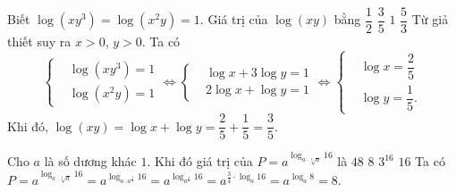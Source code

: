 	\begin{ex}
		Biết $\log\left(xy^3\right)=\log\left(x^2y\right)=1$. Giá trị của $\log(xy)$ bằng
		\choice
		{$\dfrac{1}{2}$}
		{\True $\dfrac{3}{5}$}
		{$1$}
		{$\dfrac{5}{3}$}
		\loigiai
		{
			Từ giả thiết suy ra $x>0$, $y>0$. Ta có
			\[\left\{\begin{aligned}&\log\left(xy^3\right)=1 \\&\log\left(x^2y\right) = 1\end{aligned}\right. \Leftrightarrow \left\{\begin{aligned}&\log x+3\log y=1 \\&2\log x+\log y=1\end{aligned}\right. \Leftrightarrow \left\{\begin{aligned}&\log x=\dfrac{2}{5} \\&\log y=\dfrac{1}{5}.\end{aligned}\right.\]
			Khi đó, $\log(xy)=\log x+\log y = \dfrac{2}{5}+\dfrac{1}{5}=\dfrac{3}{5}$.
		}
	\end{ex}
	\begin{ex}
		Cho $a$ là số dương khác $1$. Khi đó giá trị của $P=a^{\log_{a\cdot\sqrt[3]{a}}16}$ là
		\choice
		{$48$}
		{\True $8$}
		{$3^{16}$}
		{$16$}
		\loigiai
		{
			Ta có $P=a^{\log_{a\cdot\sqrt[3]{a}}16}=a^{\log_{a\cdot a^{\frac{1}{3}}}16}=a^{\log_{a^{\frac{4}{3}}}16}=a^{\frac{3}{4}\cdot\log_{a}16}=a^{\log_{a}8}=8$.
		}
	\end{ex}

